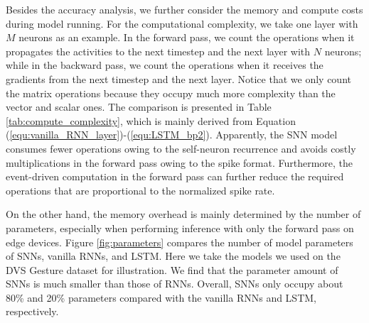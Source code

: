\documentclass[journal,10pt,twocolumn]{IEEETran}
\begin{document}
Besides the accuracy analysis, we further consider the memory and compute costs during model running. For the computational complexity, we take one layer with $M$ neurons as an example. In the forward pass, we count the operations when it propagates the activities to the next timestep and the next layer with $N$ neurons; while in the backward pass, we count the operations when it receives the gradients from the next timestep and the next layer. Notice that we only count the matrix operations because they occupy much more complexity than the vector and scalar ones. The comparison is presented in Table \ref{tab:compute_complexity}, which is mainly derived from Equation (\ref{equ:vanilla_RNN_layer})-(\ref{equ:LSTM_bp2}). Apparently, the SNN model consumes fewer operations owing to the self-neuron recurrence and avoids costly multiplications in the forward pass owing to the spike format. Furthermore, the event-driven computation in the forward pass can further reduce the required operations that are proportional to the normalized spike rate.

\begin{table}[!htbp]
\caption{Computational complexity comparison. ADDs -- additions, MULs -- multiplications, MACs -- multiplications and additions, $\alpha$ -- normalized spike rate.}
\label{tab:compute_complexity}
\vspace{2pt}
\centering
\renewcommand\arraystretch{1.3}
\end{table}

On the other hand, the memory overhead is mainly determined by the number of parameters, especially when performing inference with only the forward pass on edge devices. Figure \ref{fig:parameters} compares the number of model parameters of SNNs, vanilla RNNs, and LSTM. Here we take the models we used on the DVS Gesture dataset for illustration. We find that the parameter amount of SNNs is much smaller than those of RNNs. Overall, SNNs only occupy about 80\% and 20\% parameters compared with the vanilla RNNs and LSTM, respectively.
\end{document}
